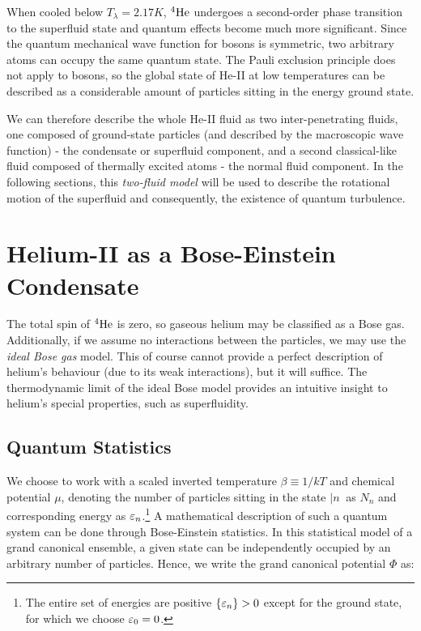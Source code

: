 When cooled below $ T_{\lambda}=2.17\unit{K} $, ${}^4\mathrm{He}$ undergoes a second-order phase transition to the superfluid state and quantum effects become much more significant. Since the quantum mechanical wave function for bosons is symmetric, two arbitrary atoms can occupy the same quantum state. The Pauli exclusion principle does not apply to bosons, so the global state of He-II at low temperatures can be described as a considerable amount of particles sitting in the energy ground state.

We can therefore describe the whole He-II fluid as two inter-penetrating fluids, one composed of ground-state particles (and described by the macroscopic wave function) - the condensate or superfluid component, and a second classical-like fluid composed of thermally excited atoms - the normal fluid component. In the following sections, this \emph{two-fluid model} will be used to describe the rotational motion of the superfluid and consequently, the existence of quantum turbulence.

\newpage

\section{Helium-II as a Bose-Einstein Condensate}
The total spin of ${}^4\mathrm{He}$ is zero, so gaseous helium may be classified as a Bose gas. Additionally, if we assume no interactions between the particles, we may use the \textit{ideal Bose gas} model. This of course cannot provide a perfect description of helium's behaviour (due to its weak interactions), but it will suffice. The thermodynamic limit of the ideal Bose model provides an intuitive insight to helium's special properties, such as superfluidity.

\subsection*{Quantum Statistics}

We choose to work with a scaled inverted temperature $\beta\equiv 1/kT $ and chemical potential $\mu$, denoting the number of particles sitting in the state $\vert n\>$ as $N_n$ and corresponding energy as $\varepsilon_n$.\footnote{The entire set of energies are positive $\{\varepsilon_n\} > 0$ except for the ground state, for which we choose $\varepsilon_0 = 0$.} 
A mathematical description of such a quantum system can be done through Bose-Einstein statistics. In this statistical model of a grand canonical ensemble, a given state can be independently occupied by an arbitrary number of particles. Hence, we write the grand canonical potential $ \Phi $ as:


